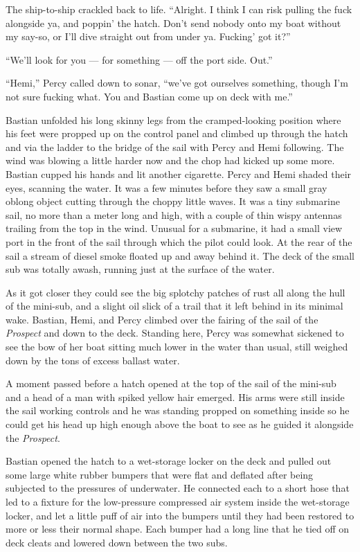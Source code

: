 \documentclass[]{scrbook}
\begin{document}
The ship-to-ship crackled back to life. ``Alright. I think I can risk
pulling the fuck alongside ya, and poppin' the hatch. Don't send nobody
onto my boat without my say-so, or I'll dive straight out from under ya.
Fucking' got it?''

``We'll look for you --- for something --- off the port side. Out.''

``Hemi,'' Percy called down to sonar, ``we've got ourselves something,
though I'm not sure fucking what. You and Bastian come up on deck with
me.''

Bastian unfolded his long skinny legs from the cramped-looking position
where his feet were propped up on the control panel and climbed up
through the hatch and via the ladder to the bridge of the sail with
Percy and Hemi following. The wind was blowing a little harder now and
the chop had kicked up some more. Bastian cupped his hands and lit
another cigarette. Percy and Hemi shaded their eyes, scanning the water.
It was a few minutes before they saw a small gray oblong object cutting
through the choppy little waves. It was a tiny submarine sail, no more
than a meter long and high, with a couple of thin wispy antennas
trailing from the top in the wind. Unusual for a submarine, it had a
small view port in the front of the sail through which the pilot could
look. At the rear of the sail a stream of diesel smoke floated up and
away behind it. The deck of the small sub was totally awash, running
just at the surface of the water.

As it got closer they could see the big splotchy patches of rust all
along the hull of the mini-sub, and a slight oil slick of a trail that
it left behind in its minimal wake. Bastian, Hemi, and Percy climbed
over the fairing of the sail of the \emph{Prospect} and down to the
deck. Standing here, Percy was somewhat sickened to see the bow of her
boat sitting much lower in the water than usual, still weighed down by
the tons of excess ballast water.

A moment passed before a hatch opened at the top of the sail of the
mini-sub and a head of a man with spiked yellow hair emerged. His arms
were still inside the sail working controls and he was standing propped
on something inside so he could get his head up high enough above the
boat to see as he guided it alongside the \emph{Prospect}.

Bastian opened the hatch to a wet-storage locker on the deck and pulled
out some large white rubber bumpers that were flat and deflated after
being subjected to the pressures of underwater. He connected each to a
short hose that led to a fixture for the low-pressure compressed air
system inside the wet-storage locker, and let a little puff of air into
the bumpers until they had been restored to more or less their normal
shape. Each bumper had a long line that he tied off on deck cleats and
lowered down between the two subs.
\end{document}
